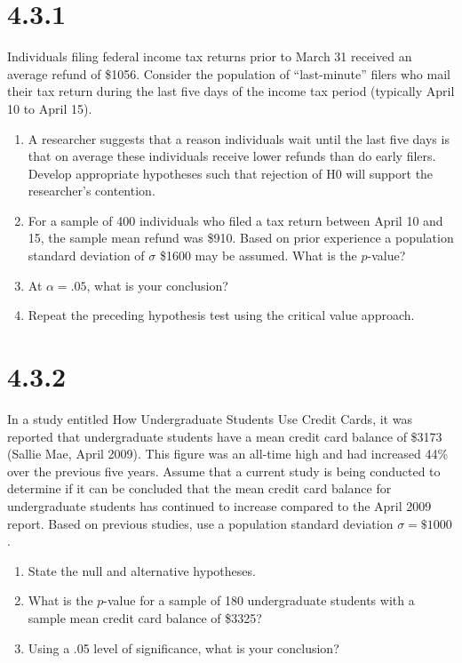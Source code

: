 \documentclass{article}
\begin{document}
\section*{4.3.1}
Individuals filing federal income tax returns prior to March 31 received an average refund of \$1056. Consider the population of “last-minute” filers who mail their tax return during the last five days of the income tax period (typically April 10 to April 15).
\begin{enumerate}
  \item A researcher suggests that a reason individuals wait until the last five days is that on average these individuals receive lower refunds than do early filers. Develop appropriate hypotheses such that rejection of H0 will support the researcher’s contention.
  \item For a sample of 400 individuals who filed a tax return between April 10 and 15, the sample mean refund was \$910. Based on prior experience a population standard deviation of $\sigma$ \$1600 may be assumed. What is the $p$-value?
  \item At $\alpha =.05$, what is your conclusion?
  \item Repeat the preceding hypothesis test using the critical value approach.
\end{enumerate}

\section*{4.3.2}
In a study entitled How Undergraduate Students Use Credit Cards, it was reported that undergraduate students have a mean credit card balance of \$3173 (Sallie Mae, April 2009). This figure was an all-time high and had increased 44\% over the previous five years. Assume that a current study is being conducted to determine if it can be concluded that the mean credit card balance for undergraduate students has continued to increase compared to the April 2009 report. Based on previous studies, use a population standard deviation $\sigma =\$1000$.
\begin{enumerate}
  \item State the null and alternative hypotheses.\
  \item What is the $p$-value for a sample of 180 undergraduate students with a sample mean credit card balance of \$3325?
  \item Using a .05 level of significance, what is your conclusion?
\end{enumerate}
\end{document}
